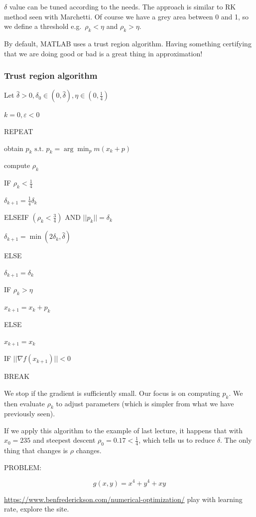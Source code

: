 $\delta$ value can be tuned according to the needs. The approach is
similar to RK method seen with Marchetti. Of course we have a grey area
between 0 and 1, so we define a threshold e.g.~$\rho_k < \eta$ and
$\rho_k > \eta$.

By default, MATLAB uses a trust region algorithm. Having something
certifying that we are doing good or bad is a great thing in
approximation!

\hypertarget{trust-region-algorithm}{%
\subsubsection{Trust region algorithm}\label{trust-region-algorithm}}

Let
$\hat{\delta}>0, \delta_0 \in (0,\hat{\delta}), \eta \in (0,\frac{1}{4})$

$k=0, \varepsilon < 0$

REPEAT

obtain $p_k \text{ s.t. } p_k=\arg \min_p m(x_k+p)$

compute $\rho_k$

IF $\rho_k < \frac{1}{4}$

$\delta_{k+1}=\frac{1}{4}\delta_k$

ELSEIF $(\rho_k < \frac{3}{4})$ AND $||p_k||=\delta_k$

$\delta_{k+1}=\min (2\delta_k, \hat{\delta})$

ELSE

$\delta_{k+1}=\delta_{k}$

IF $\rho_k > \eta$

$x_{k+1}= x_{k}+p_{k}$

ELSE

$x_{k+1}= x_{k}$

IF $||\nabla f(x_{k+1})||<0$

BREAK

We stop if the gradient is sufficiently small. Our focus is on computing
$p_k$. We then evaluate $\rho_k$ to adjust parameters (which is simpler
from what we have previously seen).

If we apply this algorithm to the example of last lecture, it happens
that with $x_0=235$ and steepest descent $\rho_0=0.17 < \frac{1}{4}$,
which tells us to reduce $\delta$. The only thing that changes is $\rho$
changes.

PROBLEM:

$$
g(x,y)=x^4+y^4+xy
$$

\url{https://www.benfrederickson.com/numerical-optimization/} play with
learning rate, explore the site.

